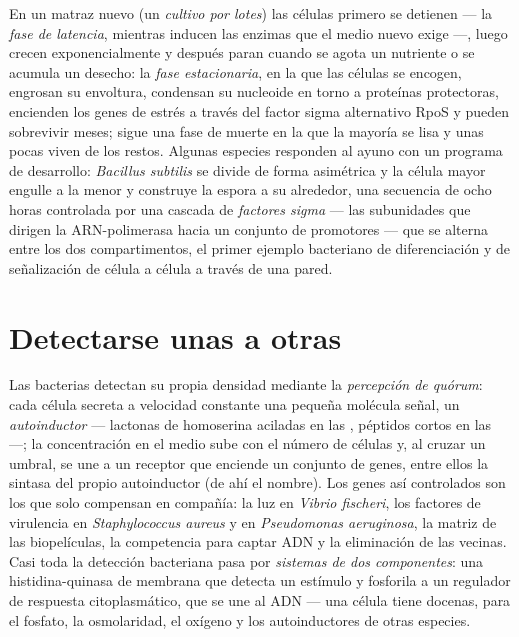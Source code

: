 \begin{definition}\label{def:b3:bacteriology:phases}
En un matraz nuevo (un \emph{cultivo por lotes}) las células primero se
detienen --- la \emph{fase de latencia}, mientras inducen las enzimas que
el medio nuevo exige ---, luego crecen exponencialmente y después paran
cuando se agota un nutriente o se acumula un desecho: la \emph{fase
estacionaria}, en la que las células se encogen, engrosan su envoltura,
condensan su nucleoide en torno a proteínas protectoras, encienden los
genes de estrés a través del factor sigma alternativo RpoS y pueden
sobrevivir meses; sigue una fase de muerte en la que la mayoría se lisa y
unas pocas viven de los restos. Algunas especies responden al ayuno con
un programa de desarrollo: \emph{Bacillus subtilis} se divide de forma
asimétrica y la célula mayor engulle a la menor y construye la espora a
su alrededor, una secuencia de ocho horas controlada por una cascada de
\emph{factores sigma} --- las subunidades que dirigen la ARN-polimerasa
hacia un conjunto de promotores --- que se alterna entre los dos
compartimentos, el primer ejemplo bacteriano de diferenciación y de
señalización de célula a célula a través de una pared.
\end{definition}

\section{Detectarse unas a otras}

\begin{definition}\label{def:b3:bacteriology:quorum}
Las bacterias detectan su propia densidad mediante la \emph{percepción de
quórum}: cada célula secreta a velocidad constante una pequeña molécula
señal, un \emph{autoinductor} --- lactonas de homoserina aciladas en las
, péptidos cortos en las  ---; la concentración
en el medio sube con el número de células y, al cruzar un umbral, se une
a un receptor que enciende un conjunto de genes, entre ellos la sintasa
del propio autoinductor (de ahí el nombre). Los genes así controlados son
los que solo compensan en compañía: la luz en \emph{Vibrio fischeri}, los
factores de virulencia en \emph{Staphylococcus aureus} y en
\emph{Pseudomonas aeruginosa}, la matriz de las biopelículas, la
competencia para captar ADN y la eliminación de las vecinas. Casi toda la
detección bacteriana pasa por \emph{sistemas de dos componentes}: una
histidina-quinasa de membrana que detecta un estímulo y fosforila a un
regulador de respuesta citoplasmático, que se une al ADN --- una célula
tiene docenas, para el fosfato, la osmolaridad, el oxígeno y los
autoinductores de otras especies.
\end{definition}

